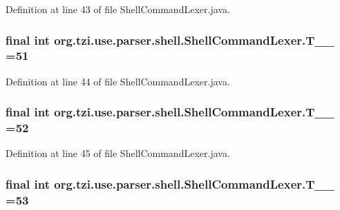 Definition at line 43 of file Shell\-Command\-Lexer.\-java.

\hypertarget{classorg_1_1tzi_1_1use_1_1parser_1_1shell_1_1_shell_command_lexer_aef19e799f57b5ce1b0623fca7bbb2177}{
\subsubsection[{T\-\_\-\-\_\-51}]{\setlength{\rightskip}{0pt plus 5cm}final int org.\-tzi.\-use.\-parser.\-shell.\-Shell\-Command\-Lexer.\-T\-\_\-\-\_ =51\hspace{0.3cm}{\ttfamily [static]}}}\label{classorg_1_1tzi_1_1use_1_1parser_1_1shell_1_1_shell_command_lexer_aef19e799f57b5ce1b0623fca7bbb2177}


Definition at line 44 of file Shell\-Command\-Lexer.\-java.

\hypertarget{classorg_1_1tzi_1_1use_1_1parser_1_1shell_1_1_shell_command_lexer_a6a13f2d012e15184a8a4a3a10513f6dd}{
\subsubsection[{T\-\_\-\-\_\-52}]{\setlength{\rightskip}{0pt plus 5cm}final int org.\-tzi.\-use.\-parser.\-shell.\-Shell\-Command\-Lexer.\-T\-\_\-\-\_ =52\hspace{0.3cm}{\ttfamily [static]}}}\label{classorg_1_1tzi_1_1use_1_1parser_1_1shell_1_1_shell_command_lexer_a6a13f2d012e15184a8a4a3a10513f6dd}


Definition at line 45 of file Shell\-Command\-Lexer.\-java.

\hypertarget{classorg_1_1tzi_1_1use_1_1parser_1_1shell_1_1_shell_command_lexer_a0c204138312d2e851f9b286074e6586d}{
\subsubsection[{T\-\_\-\-\_\-53}]{\setlength{\rightskip}{0pt plus 5cm}final int org.\-tzi.\-use.\-parser.\-shell.\-Shell\-Command\-Lexer.\-T\-\_\-\-\_ =53\hspace{0.3cm}{\ttfamily [static]}}}\label{classorg_1_1tzi_1_1use_1_1parser_1_1shell_1_1_shell_command_lexer_a0c204138312d2e851f9b286074e6586d}



